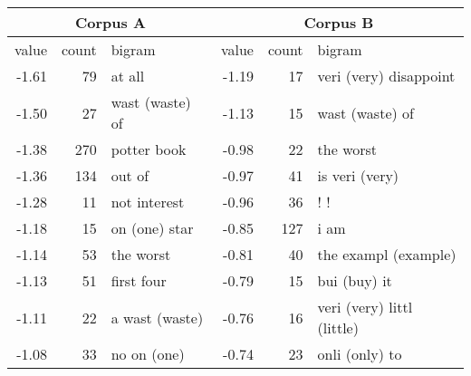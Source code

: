 \documentclass[japanese]{jnlp_1.3d}
\begin{document}
\begin{table}[t]
\label{tab:feature_biw}
  \begin{center}
  \begin{tabular}{|r|r|l|r|r|l|} \hline
 \multicolumn{3}{|c|}{Corpus A} &  \multicolumn{3}{|c|}{Corpus B} \\ \hline  
value & count & bigram & value & count & bigram \\ \hline
-1.61 & 79 & at all & -1.19 & 17 & veri (very) disappoint \\ 
-1.50 & 27 & wast (waste) of & -1.13 & 15 & wast (waste) of  \\ 
-1.38 & 270 & potter book & -0.98 & 22 & the worst  \\ 
-1.36 & 134 & out of & -0.97 & 41 & is veri (very) \\ 
-1.28 & 11 & not interest & -0.96 & 36 & ! !    \\ 
-1.18 & 15 & on (one) star & -0.85 & 127 & i am  \\ 
-1.14 & 53 & the worst & -0.81 & 40 & the exampl (example)  \\ 
-1.13 & 51 & first four & -0.79 & 15 & bui (buy) it  \\ 
-1.11 & 22 & a wast (waste) & -0.76 & 16 & veri (very) littl (little) \\     
-1.08 & 33 & no on (one) & -0.74 & 23 & onli (only) to \\
 \hline
\end{tabular}
  \end{center}
\end{table}
\end{document}
